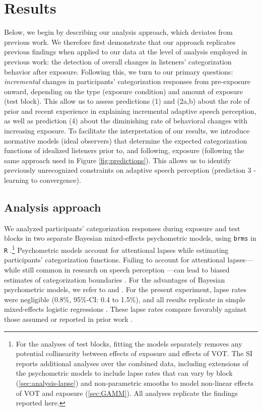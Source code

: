\documentclass[
  11pt,
  man,mask,floatsintext]{apa6}
\begin{document}
\section{Results}\label{sec:results}

Below, we begin by describing our analysis approach, which deviates from previous work. We therefore first demonstrate that our approach replicates previous findings when applied to our data at the level of analysis employed in previous work: the detection of overall changes in listeners' categorization behavior after exposure. Following this, we turn to our primary questions: \emph{incremental} changes in participants' categorization responses from pre-exposure onward, depending on the type (exposure condition) and amount of exposure (test block). This allow us to assess predictions (1) and (2a,b) about the role of prior and recent experience in explaining incremental adaptive speech perception, as well as prediction (4) about the diminishing rate of behavioral changes with increasing exposure. To facilitate the interpretation of our results, we introduce normative models (ideal observers) that determine the expected categorization functions of idealized listeners prior to, and following, exposure (following the same approach used in Figure \ref{fig:predictions}). This allows us to identify previously unrecognized constraints on adaptive speech perception (prediction 3 - learning to convergence).

\subsection{Analysis approach}\label{analysis-approach}

We analyzed participants' categorization responses during exposure and test blocks in two separate Bayesian mixed-effects psychometric models, using \texttt{brms} \autocite{R-brms_a} in \texttt{R} \autocite{R,RStudio}.\footnote{For the analyses of test blocks, fitting the models separately removes any potential collinearity between effects of exposure and effects of VOT. The SI reports additional analyses over the combined data, including extensions of the psychometric models to include lapse rates that can vary by block (\ref{sec:analysis-lapse}) and non-parametric smooths to model non-linear effects of VOT and exposure (\ref{sec:GAMM}). All analyses replicate the findings reported here.} Psychometric models account for attentional lapses while estimating participants' categorization functions. Failing to account for attentional lapses---while still common in research on speech perception \autocites[for exceptions, see][]{clayards2008,kleinschmidt-jaeger2016}---can lead to biased estimates of categorization boundaries \autocite{prins2011,wichmann-hill2001}. For the advantages of Bayesian psychometric models, we refer to \textcite{kuss2005} and \textcite{prins2019}. For the present experiment, lapse rates were negligible (0.8\%, 95\%-CI: 0.4 to 1.5\%), and all results replicate in simple mixed-effects logistic regressions \autocite{jaeger2008}. These lapse rates compare favorably against those assumed or reported in prior work \autocites[e.g.,][]{clayards2008,kleinschmidt-jaeger2016,kleinschmidt2020}.
\end{document}
